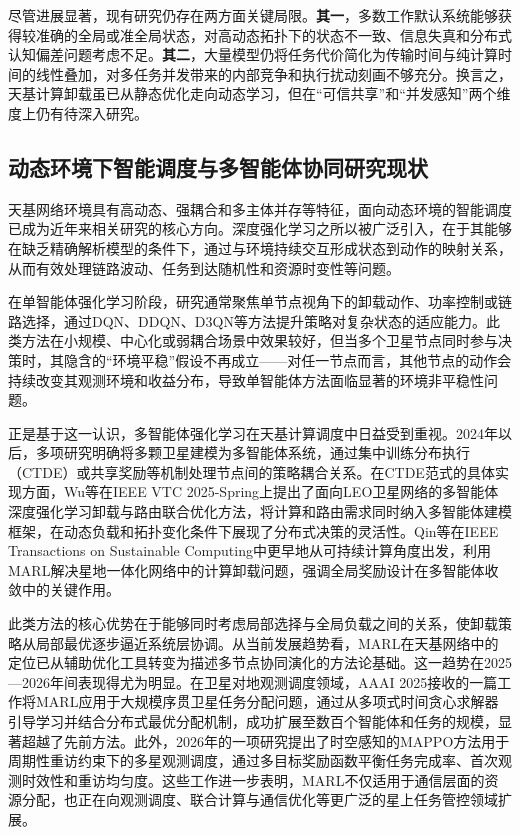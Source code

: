 尽管进展显著，现有研究仍存在两方面关键局限。\textbf{其一}，多数工作默认系统能够获得较准确的全局或准全局状态，对高动态拓扑下的状态不一致、信息失真和分布式认知偏差问题考虑不足。\textbf{其二}，大量模型仍将任务代价简化为传输时间与纯计算时间的线性叠加，对多任务并发带来的内部竞争和执行扰动刻画不够充分。换言之，天基计算卸载虽已从静态优化走向动态学习，但在“可信共享”和“并发感知”两个维度上仍有待深入研究。

\subsection{动态环境下智能调度与多智能体协同研究现状}

天基网络环境具有高动态、强耦合和多主体并存等特征，面向动态环境的智能调度已成为近年来相关研究的核心方向。深度强化学习之所以被广泛引入，在于其能够在缺乏精确解析模型的条件下，通过与环境持续交互形成状态到动作的映射关系，从而有效处理链路波动、任务到达随机性和资源时变性等问题\cite{ref14}。

在单智能体强化学习阶段，研究通常聚焦单节点视角下的卸载动作、功率控制或链路选择，通过DQN、DDQN、D3QN等方法提升策略对复杂状态的适应能力。此类方法在小规模、中心化或弱耦合场景中效果较好，但当多个卫星节点同时参与决策时，其隐含的“环境平稳”假设不再成立——对任一节点而言，其他节点的动作会持续改变其观测环境和收益分布，导致单智能体方法面临显著的环境非平稳性问题。

正是基于这一认识，多智能体强化学习在天基计算调度中日益受到重视。2024年以后，多项研究明确将多颗卫星建模为多智能体系统，通过集中训练分布执行（CTDE）或共享奖励等机制处理节点间的策略耦合关系\cite{ref2,ref3}。在CTDE范式的具体实现方面，Wu等在IEEE VTC 2025-Spring上提出了面向LEO卫星网络的多智能体深度强化学习卸载与路由联合优化方法，将计算和路由需求同时纳入多智能体建模框架，在动态负载和拓扑变化条件下展现了分布式决策的灵活性\cite{ref23}。Qin等在IEEE Transactions on Sustainable Computing中更早地从可持续计算角度出发，利用MARL解决星地一体化网络中的计算卸载问题，强调全局奖励设计在多智能体收敛中的关键作用\cite{ref1}。

此类方法的核心优势在于能够同时考虑局部选择与全局负载之间的关系，使卸载策略从局部最优逐步逼近系统层协调。从当前发展趋势看，MARL在天基网络中的定位已从辅助优化工具转变为描述多节点协同演化的方法论基础。这一趋势在2025—2026年间表现得尤为明显。在卫星对地观测调度领域，AAAI 2025接收的一篇工作将MARL应用于大规模序贯卫星任务分配问题，通过从多项式时间贪心求解器引导学习并结合分布式最优分配机制，成功扩展至数百个智能体和任务的规模，显著超越了先前方法\cite{ref24}。此外，2026年的一项研究提出了时空感知的MAPPO方法用于周期性重访约束下的多星观测调度，通过多目标奖励函数平衡任务完成率、首次观测时效性和重访均匀度\cite{ref25}。这些工作进一步表明，MARL不仅适用于通信层面的资源分配，也正在向观测调度、联合计算与通信优化等更广泛的星上任务管控领域扩展。

